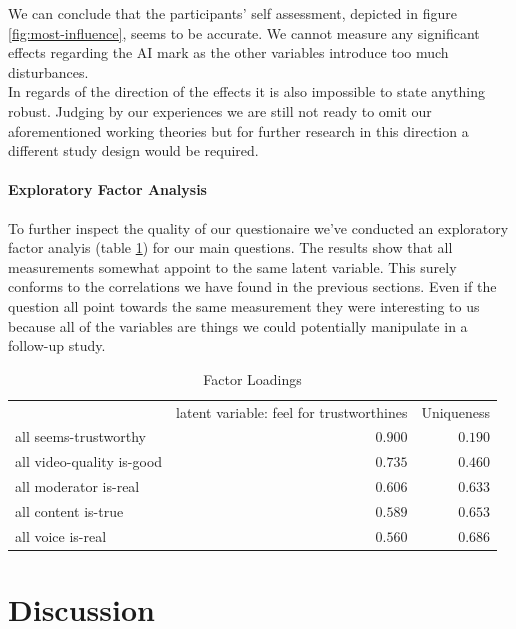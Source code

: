 \documentclass[
  a4paper,  %
  twoside,  %
  bibliography=totoc,
  headsepline,
  cleardoublepage=empty,
  parskip=half,
  draft=false
]{scrbook}
\begin{document}
 We can conclude that the participants' self assessment, depicted in figure \ref{fig:most-influence}, seems to be accurate. We cannot measure any significant effects regarding the AI mark as the other variables introduce too much disturbances. \\
 In regards of the direction of the effects it is also impossible to state anything robust. Judging by our experiences we are still not ready to omit our aforementioned working theories but for further research in this direction a different study design would be required.

 \subsubsection{Exploratory Factor Analysis}

 To further inspect the quality of our questionaire we've conducted an exploratory factor analyis (table \ref{tab:factorLoadings}) for our main questions. The results show that all measurements somewhat appoint to the same latent variable. This surely conforms to the correlations we have found in the previous sections. Even if the question all point towards the same measurement they were interesting to us because all of the variables are things we could potentially manipulate in a follow-up study. 

\begin{table}[h]
	\centering
	\caption{Factor Loadings}
	\label{tab:factorLoadings}
	{
		\begin{tabular}{lrr}
			\toprule
			 & latent variable: feel for trustworthines & Uniqueness  \\
			\cmidrule[0.4pt]{1-3}
			all seems-trustworthy & $0.900$ & $0.190$  \\
			all video-quality is-good & $0.735$ & $0.460$  \\
			all moderator is-real & $0.606$ & $0.633$  \\
			all content is-true & $0.589$ & $0.653$  \\
			all voice is-real & $0.560$ & $0.686$  \\
			\bottomrule
		\end{tabular}
	}
\end{table}

\chapter{Discussion}
\end{document}

